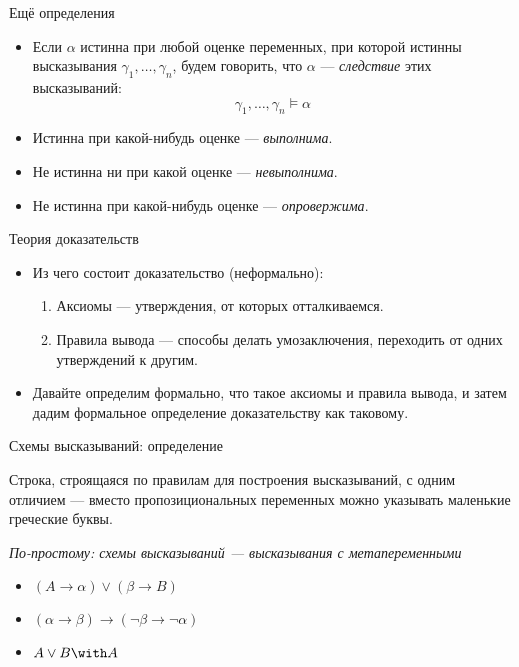 \documentclass[handout]{beamer}
\begin{document}
\begin{frame}{Ещё определения}
\begin{itemize}
\item Если $\alpha$ истинна при любой оценке переменных, при которой истинны 
высказывания $\gamma_1, \dots, \gamma_n$, будем говорить, что $\alpha$ --- \emph{следствие} этих высказываний:
$$\gamma_1, \dots, \gamma_n \models \alpha$$\pause
\item Истинна при какой-нибудь оценке --- \emph{выполнима}.\pause
\item Не истинна ни при какой оценке --- \emph{невыполнима}.\pause
\item Не истинна при какой-нибудь оценке --- \emph{опровержима}.
\end{itemize}
\end{frame}

\begin{frame}{Теория доказательств}

\begin{itemize}
\item Из чего состоит доказательство (неформально):
\begin{enumerate}
\item Аксиомы --- утверждения, от которых отталкиваемся.
\item Правила вывода --- способы делать умозаключения, переходить от одних утверждений к другим.
\end{enumerate}\pause

\item Давайте определим формально, что такое аксиомы и правила вывода, и затем дадим формальное 
определение доказательству как таковому.
\end{itemize}

\end{frame}

\begin{frame}{Схемы высказываний: определение}

\begin{defrus} Строка, строящаяся по правилам для построения высказываний, с одним отличием ---
вместо пропозициональных переменных можно указывать маленькие греческие буквы.\end{defrus}\pause

\emph{По-простому: схемы высказываний --- высказывания с метапеременными}\pause

\begin{exmprus}
\begin{itemize}
\item $(A \rightarrow \alpha) \vee (\beta \rightarrow B)$\pause
\item $(\alpha\rightarrow\beta)\rightarrow(\neg\beta\rightarrow\neg\alpha)$\pause
\item $A\vee B \with A$
\end{itemize}
\end{exmprus}

\end{frame}
\end{document}
